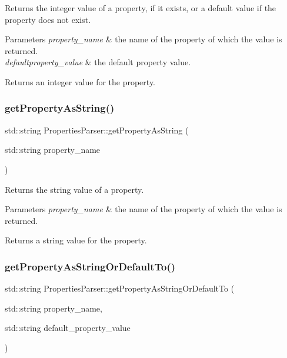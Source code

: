 Returns the integer value of a property, if it exists, or a default value if the property does not exist.


\begin{DoxyParams}{Parameters}
{\em property\+\_\+name} & the name of the property of which the value is returned. \\
\hline
{\em defaultproperty\+\_\+value} & the default property value. \\
\hline
\end{DoxyParams}
\begin{DoxyReturn}{Returns}
an integer value for the property. 
\end{DoxyReturn}
\mbox{\label{class_properties_parser_af52ae62c22c070ab8f286cb29897dc17}} 
\subsubsection{\texorpdfstring{get\+Property\+As\+String()}{getPropertyAsString()}}
{\footnotesize\ttfamily std\+::string Properties\+Parser\+::get\+Property\+As\+String (\begin{DoxyParamCaption}\item[{std\+::string}]{property\+\_\+name }\end{DoxyParamCaption})}

Returns the string value of a property.


\begin{DoxyParams}{Parameters}
{\em property\+\_\+name} & the name of the property of which the value is returned. \\
\hline
\end{DoxyParams}
\begin{DoxyReturn}{Returns}
a string value for the property. 
\end{DoxyReturn}
\mbox{\label{class_properties_parser_a29d380b8b5dfdf4e3872e02b33bbc765}} 
\subsubsection{\texorpdfstring{get\+Property\+As\+String\+Or\+Default\+To()}{getPropertyAsStringOrDefaultTo()}}
{\footnotesize\ttfamily std\+::string Properties\+Parser\+::get\+Property\+As\+String\+Or\+Default\+To (\begin{DoxyParamCaption}\item[{std\+::string}]{property\+\_\+name,  }\item[{std\+::string}]{default\+\_\+property\+\_\+value }\end{DoxyParamCaption})}

